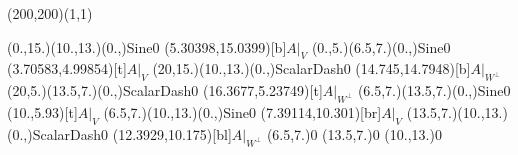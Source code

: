 \unitlength=1bp%

\begin{feynartspicture}(200,200)(1,1)

\FADiagram{}
\FAProp(0.,15.)(10.,13.)(0.,){Sine}{0}
\FALabel(5.30398,15.0399)[b]{$A|_V$}
\FAProp(0.,5.)(6.5,7.)(0.,){Sine}{0}
\FALabel(3.70583,4.99854)[t]{$A|_V$}
\FAProp(20,15.)(10.,13.)(0.,){ScalarDash}{0}
\FALabel(14.745,14.7948)[b]{$A|_{W^\perp}$}
\FAProp(20,5.)(13.5,7.)(0.,){ScalarDash}{0}
\FALabel(16.3677,5.23749)[t]{$A|_{W^\perp}$}
\FAProp(6.5,7.)(13.5,7.)(0.,){Sine}{0}
\FALabel(10.,5.93)[t]{$A|_V$}
\FAProp(6.5,7.)(10.,13.)(0.,){Sine}{0}
\FALabel(7.39114,10.301)[br]{$A|_V$}
\FAProp(13.5,7.)(10.,13.)(0.,){ScalarDash}{0}
\FALabel(12.3929,10.175)[bl]{$A|_{W^\perp}$}
\FAVert(6.5,7.){0}
\FAVert(13.5,7.){0}
\FAVert(10.,13.){0}
\end{feynartspicture}

